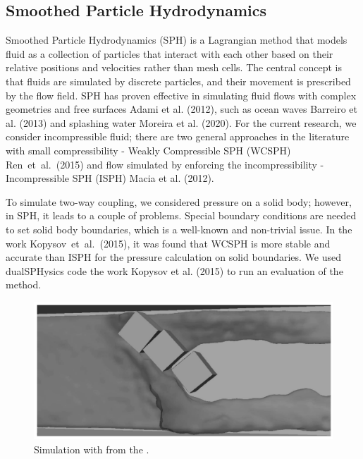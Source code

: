 \subsection{Smoothed Particle Hydrodynamics}

Smoothed Particle Hydrodynamics (SPH) is a Lagrangian method that models fluid as a collection of particles that interact with each other based on their relative positions and velocities rather than mesh cells. The central concept is that fluids are simulated by discrete particles, and their movement is prescribed by the flow field. SPH has proven effective in simulating fluid flows with complex geometries and free surfaces Adami et al. (2012)\cite{adami2012SPH}, such as ocean waves Barreiro et al. (2013)\cite{barreiro2013SPH} and splashing water Moreira et al. (2020)\cite{moreira2020SPH}. For the current research, we consider incompressible fluid; there are two general approaches in the literature with small compressibility - Weakly Compressible SPH (WCSPH) Ren~et~al.~(2015)\cite{ren2015nonlinear} and flow simulated by enforcing the incompressibility -  Incompressible SPH (ISPH) Macia et al. (2012)\cite{macia2012boundary}. 

To simulate two-way coupling, we considered pressure on a solid body; however, in SPH, it leads to a couple of problems. Special boundary conditions are needed to set solid body boundaries, which is a well-known and non-trivial issue. In the work Kopysov~et~al.~(2015)\cite{kopysov2015modeling}, it was found that WCSPH is more stable and accurate than ISPH for the pressure calculation on solid boundaries. We used dualSPHysics code \cite{Dual_SPH2019accuracy} the work Kopysov et al. (2015) \cite{kopysov2015modeling} to run an evaluation of the method.

\begin{figure}[!ht]
    \centering
    \includegraphics[width=16cm]{GWU_Thesis_Sarmakeeva/Images/chap1/3_blocks_SPH.png}
    \caption{Simulation with \cite{Dual_SPH2019accuracy} from the \cite{sarmakeeva2017meshfree}.}
    \label{fig:3_blocks_SPH}
\end{figure}

